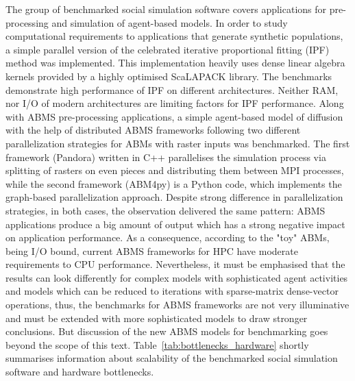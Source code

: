 The group of benchmarked social simulation software covers applications for pre-processing and simulation of agent-based models.
In order to study computational requirements to applications that generate synthetic populations,
a simple parallel version of the celebrated iterative proportional fitting (IPF) method was implemented.
This implementation heavily uses dense linear algebra kernels provided by a highly optimised ScaLAPACK library.
The benchmarks demonstrate high performance of IPF on different architectures.
Neither RAM, nor I/O of modern architectures are limiting factors for IPF performance.
Along with ABMS pre-processing applications,
a simple agent-based model of diffusion with the help of distributed ABMS frameworks
following two different parallelization strategies for ABMs with raster inputs was benchmarked.
The first framework (Pandora) written in C++ parallelises
the simulation process via splitting of rasters on even pieces and distributing them between MPI processes,
while the second framework (ABM4py) is a Python code,
which implements the graph-based parallelization approach.
Despite strong difference in parallelization strategies, in both cases, the observation delivered the same pattern:
ABMS applications produce a big amount of output which has a strong negative impact on application performance.
As a consequence, according to the "toy" ABMs, being I/O bound, current ABMS frameworks for HPC have moderate requirements to CPU performance. Nevertheless, it must be emphasised that the results can look differently for complex models with sophisticated agent activities and models which can be reduced to iterations with sparse-matrix dense-vector operations, thus, the benchmarks for ABMS frameworks are not very illuminative and must be extended with more sophisticated models to draw stronger conclusions. But discussion of the new ABMS models for benchmarking goes beyond the scope of this text. Table~\ref{tab:bottlenecks_hardware} shortly summarises information about scalability of the benchmarked social simulation software and hardware bottlenecks.

